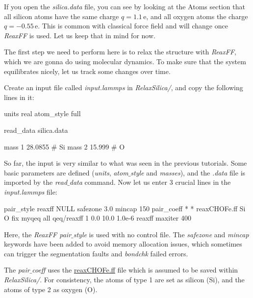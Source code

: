 \noindent If you open the \textit{silica.data} file, you can see 
by looking at the Atoms section that
all silicon atoms have the same charge $q = 1.1\,\text{e}$,
and all oxygen atoms the charge $q = -0.55\,\text{e}$.
This is common with classical force field and will change once
\textit{ReaxFF} is used. Let us keep that in mind for now.

\vspace{0.25cm} \noindent The first step we need to perform here is to relax
the structure with \textit{ReaxFF}, which we are gonna do using molecular
dynamics. To make sure that the system equilibrates
nicely, let us track some changes over time.

\vspace{0.25cm} \noindent Create an input file called \textit{input.lammps} in \textit{RelaxSilica/},
and copy the following lines in it: 

\begin{lcverbatim}
units real
atom_style full

read_data silica.data

mass 1 28.0855 # Si
mass 2 15.999 # O
\end{lcverbatim}

\noindent So far, the input is very similar to what was seen
in the previous tutorials. Some basic parameters are
defined (\textit{units}, \textit{atom$\_$style} and \textit{masses}), and 
the \textit{.data} file is imported by the \textit{read$\_$data} command.
Now let us enter 3 crucial lines in the \textit{input.lammps} file:

\begin{lcverbatim}
pair_style reaxff NULL safezone 3.0 mincap 150
pair_coeff * * reaxCHOFe.ff Si O
fix myqeq all qeq/reaxff 1 0.0 10.0 1.0e-6 reaxff maxiter 400
\end{lcverbatim}

\noindent Here, the \textit{ReaxFF pair$\_$style} is used with no control file.
The \textit{safezone} and \textit{mincap} keywords have been added
to avoid memory allocation issues, which sometimes can trigger
the segmentation faults and \textit{bondchk} failed errors.

\vspace{0.25cm} \noindent The \textit{pair$\_$coeff} uses
the \href{https://lammpstutorials.github.io/lammpstutorials-inputs/level3/reactive-silicon-dioxide/RelaxSilica/reaxCHOFe.ff}{reaxCHOFe.ff} file which is assumed
to be saved within \textit{RelaxSilica/}.
For consistency, the atoms of type 1 are set as silicon (Si),
and the atoms of type 2 as oxygen (O).

